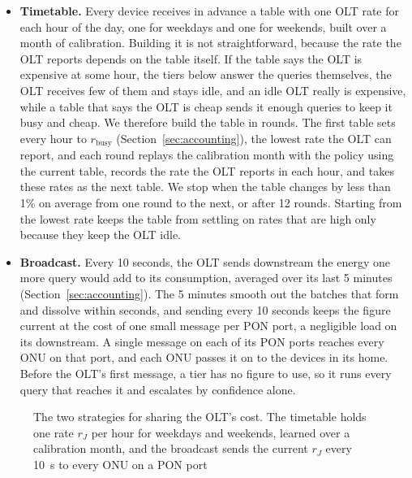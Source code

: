 \documentclass[cic,dipl,english]{infufrgs}
\begin{document}
\begin{itemize}
  \item \textbf{Timetable.} Every device receives in advance a table with one OLT rate for
  each hour of the day, one for weekdays and one for weekends, built over a month of
  calibration. Building it is not straightforward, because the rate the OLT reports
  depends on the table itself. If the table says the OLT is expensive at some hour, the
  tiers below answer the queries themselves, the OLT receives few of them and stays idle,
  and an idle OLT really is expensive, while a table that says the OLT is cheap sends it
  enough queries to keep it busy and cheap. We therefore build the table in rounds. The
  first table sets every hour to $r_{\text{busy}}$ (Section~\ref{sec:accounting}), the
  lowest rate the OLT can report, and each round replays the calibration month with the
  policy using the current table, records the rate the OLT reports in each hour, and takes
  these rates as the next table. We stop when the table changes by less than 1\% on
  average from one round to the next, or after 12 rounds. Starting from the lowest rate
  keeps the table from settling on rates that are high only because they keep the OLT
  idle.
  \item \textbf{Broadcast.} Every 10 seconds, the OLT sends downstream the energy one
  more query would add to its consumption, averaged over its last 5 minutes
  (Section~\ref{sec:accounting}). The 5 minutes smooth out the batches that form and
  dissolve within seconds, and sending every 10 seconds keeps the figure current at the
  cost of one small message per PON port, a negligible load on its downstream. A single message on each of its PON ports reaches every
  ONU on that port, and each ONU passes it on to the devices in its home. Before the
  OLT's first message, a tier has no figure to use, so it runs every query that reaches it
  and escalates by confidence alone.
\end{itemize}

\begin{figure}[htb]
  \centering
  \caption[The two strategies for sharing the OLT's cost]{The two strategies for sharing the OLT's cost.
  The timetable holds one rate $r_J$ per hour for weekdays and weekends, learned over a calibration month, and the broadcast sends the current $r_J$ every 10~s to every ONU on a PON port}
  \label{fig:olt-strategies}
  \vspace{6pt}
  
\end{figure}
\end{document}
